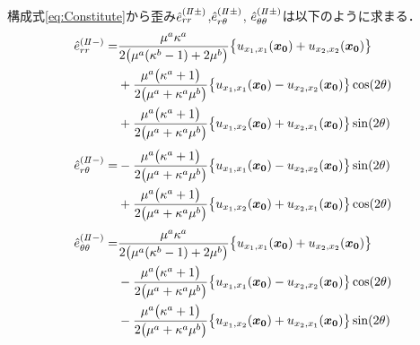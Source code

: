 構成式\eqref{eq:Constitute}から歪み$\hat{e}_{rr}^{(I\hspace{-.15em}I\pm)}$,$\hat{e}_{r\theta}^{(I\hspace{-.15em}I\pm)}$,
$\hat{e}_{\theta\theta}^{(I\hspace{-.15em}I\pm)}$は以下のように求まる．
\begin{align}
	\hat{e}_{rr}^{(I\hspace{-.15em}I-)} =
	&\frac{\mu^{a}\kappa^{a}}{2\bigl(\mu^{a}(\kappa^{b}-1)+2\mu^{b}\bigr)}
	\bigl\{u_{x_{1},x_{1}}(\bm{x_{0}})+u_{x_{2},x_{2}}(\bm{x_{0}})\bigr\}
	\nonumber
	\\
	&+\frac{\mu^{a}\bigl(\kappa^{a}+1\bigr)}{2\bigl(\mu^{a}+\kappa^{a}\mu^{b}\bigr)}
	\bigl\{u_{x_{1},x_{1}}(\bm{x_{0}})-u_{x_{2},x_{2}}(\bm{x_{0}})\bigr\}\cos(2\theta)
	\nonumber
	\\
	&+\frac{\mu^{a}\bigl(\kappa^{a}+1\bigr)}{2\bigl(\mu^{a}+\kappa^{a}\mu^{b}\bigr)}
	\bigl\{u_{x_{1},x_{2}}(\bm{x_{0}})+u_{x_{2},x_{1}}(\bm{x_{0}})\bigr\}\sin(2\theta)
	\label{eq:eRRIn2Sol}
\end{align}
\begin{align}
	\hat{e}_{r\theta}^{(I\hspace{-.15em}I-)} =
	&-\frac{\mu^{a}\bigl(\kappa^{a}+1\bigr)}{2\bigl(\mu^{a}+\kappa^{a}\mu^{b}\bigr)}
	\bigl\{u_{x_{1},x_{1}}(\bm{x_{0}})-u_{x_{2},x_{2}}(\bm{x_{0}})\bigr\}\sin(2\theta)
	\nonumber
	\\
	&+\frac{\mu^{a}\bigl(\kappa^{a}+1\bigr)}{2\bigl(\mu^{a}+\kappa^{a}\mu^{b}\bigr)}
	\bigl\{u_{x_{1},x_{2}}(\bm{x_{0}})+u_{x_{2},x_{1}}(\bm{x_{0}})\bigr\}\cos(2\theta)
	\label{eq:eRThIn2Sol}
\end{align}
\begin{align}
	\hat{e}_{\theta\theta}^{(I\hspace{-.15em}I-)} =
	&\frac{\mu^{a}\kappa^{a}}{2\bigl(\mu^{a}(\kappa^{b}-1)+2\mu^{b}\bigr)}
	\bigl\{u_{x_{1},x_{1}}(\bm{x_{0}})+u_{x_{2},x_{2}}(\bm{x_{0}})\bigr\}
	\nonumber
	\\
	&-\frac{\mu^{a}\bigl(\kappa^{a}+1\bigr)}{2\bigl(\mu^{a}+\kappa^{a}\mu^{b}\bigr)}
	\bigl\{u_{x_{1},x_{1}}(\bm{x_{0}})-u_{x_{2},x_{2}}(\bm{x_{0}})\bigr\}\cos(2\theta)
	\nonumber
	\\
	&-\frac{\mu^{a}\bigl(\kappa^{a}+1\bigr)}{2\bigl(\mu^{a}+\kappa^{a}\mu^{b}\bigr)}
	\bigl\{u_{x_{1},x_{2}}(\bm{x_{0}})+u_{x_{2},x_{1}}(\bm{x_{0}})\bigr\}\sin(2\theta)
	\label{eq:eThThIn2Sol}
\end{align}


